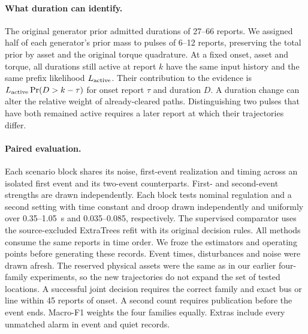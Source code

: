 \paragraph{What duration can identify.}
The original generator prior admitted durations of 27--66 reports.
We assigned half of each generator's prior mass to pulses of 6--12
reports, preserving the total prior by asset and the original torque
quadrature. At a fixed onset, asset and torque, all durations still
active at report $k$ have the same input history and the same prefix
likelihood $L_{\rm active}$. Their contribution to the evidence is
$L_{\rm active}\Pr(D>k-\tau)$ for onset report $\tau$ and duration $D$.
A duration change can alter the relative weight of already-cleared
paths. Distinguishing two pulses that have both remained active requires
a later report at which their trajectories differ.

\paragraph{Paired evaluation.}
Each scenario block shares its noise, first-event realization and
timing across an isolated first event and its two-event counterparts.
First- and second-event strengths are drawn independently.
Each block tests nominal regulation and a second setting with time constant and droop drawn
independently and uniformly over 0.35--1.05~s and 0.035--0.085,
respectively. The supervised
comparator uses the source-excluded ExtraTrees refit with its original
decision rules. All methods consume the same reports in time order.
We froze the estimators and operating points before generating these
records. Event times, disturbances and noise were drawn afresh. The
reserved physical assets were the same as in our earlier four-family
experiments, so the new trajectories do not expand the set of tested
locations.
A successful joint decision requires the correct family and exact
bus or line within 45 reports of onset. A second count requires
publication before the event ends. Macro-F1 weights the four families
equally. Extras include every unmatched alarm in event and quiet records.


